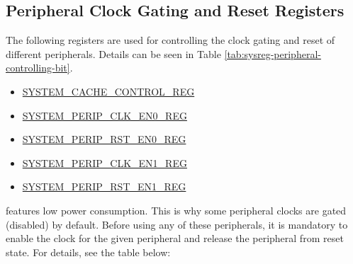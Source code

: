 \documentclass[main\_\_EN.tex]{subfiles}
\begin{document}
\subsection{Peripheral Clock Gating and Reset Registers}

The following registers are used for controlling the clock gating and reset of different peripherals. Details can be seen in Table \ref{tab:sysreg-peripheral-controlling-bit}.

\begin{itemize}
    \item \hyperref[regdesc:SYSTEMCACHECONTROLREG]{SYSTEM\_CACHE\_CONTROL\_REG}
    \item \hyperref[regdesc:SYSTEMPERIPCLKEN0REG]{SYSTEM\_PERIP\_CLK\_EN0\_REG}
    \item \hyperref[regdesc:SYSTEMPERIPRSTEN0REG]{SYSTEM\_PERIP\_RST\_EN0\_REG}
    \item \hyperref[regdesc:SYSTEMPERIPCLKEN1REG]{SYSTEM\_PERIP\_CLK\_EN1\_REG}
    \item \hyperref[regdesc:SYSTEMPERIPRSTEN1REG]{SYSTEM\_PERIP\_RST\_EN1\_REG}

\end{itemize}

\chipname{} features low power consumption. This is why some peripheral clocks are gated (disabled) by default. Before using any of these peripherals, it is mandatory to enable the clock for the given peripheral and release the peripheral from reset state. For details, see the table below:
\end{document}
